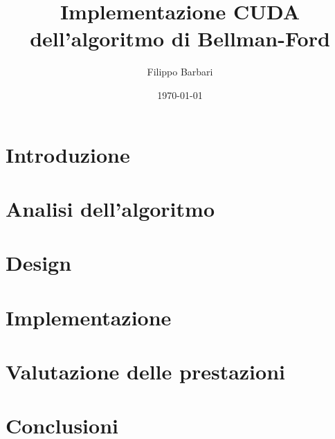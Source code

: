 \documentclass{article}
\title{Implementazione CUDA dell'algoritmo di Bellman-Ford}
\author{Filippo Barbari}
\date{\today}
\begin{document}
	
	\maketitle
	\newpage
	
	\tableofcontents
	\newpage
	
	\listoffigures
	\newpage
	
	\listoftables
	\newpage
	
	\section{Introduzione}
	
	\section{Analisi dell'algoritmo}
	
	\section{Design}
	
	\section{Implementazione}
	
	\section{Valutazione delle prestazioni}
	
	\section{Conclusioni}
	
\end{document}
